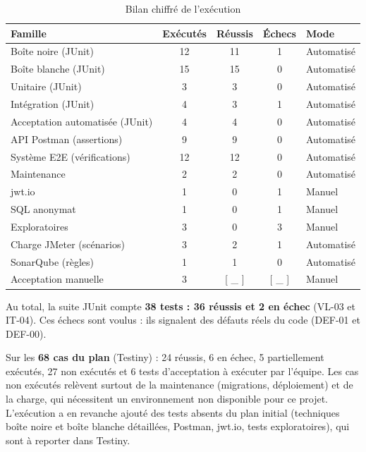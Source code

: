 \documentclass[12pt,a4paper]{report}
\begin{document}
\begin{table}[H]
\centering
\caption{Bilan chiffré de l'exécution}
\small
\begin{tabular}{@{}lcccl@{}}
\toprule
\rowcolor{evlight}\textbf{Famille} & \textbf{Exécutés} & \textbf{Réussis} & \textbf{Échecs} & \textbf{Mode}\\
\midrule
Boîte noire (JUnit) & 12 & 11 & 1 & Automatisé\\
Boîte blanche (JUnit) & 15 & 15 & 0 & Automatisé\\
Unitaire (JUnit) & 3 & 3 & 0 & Automatisé\\
Intégration (JUnit) & 4 & 3 & 1 & Automatisé\\
Acceptation automatisée (JUnit) & 4 & 4 & 0 & Automatisé\\
API Postman (assertions) & 9 & 9 & 0 & Automatisé\\
Système E2E (vérifications) & 12 & 12 & 0 & Automatisé\\
Maintenance & 2 & 2 & 0 & Automatisé\\
jwt.io & 1 & 0 & 1 & Manuel\\
SQL anonymat & 1 & 0 & 1 & Manuel\\
Exploratoires & 3 & 0 & 3 & Manuel\\
Charge JMeter (scénarios) & 3 & 2 & 1 & Automatisé\\
SonarQube (règles) & 1 & 1 & 0 & Automatisé\\
Acceptation manuelle & 3 & [ \_ ] & [ \_ ] & Manuel\\
\bottomrule
\end{tabular}
\end{table}

Au total, la suite JUnit compte \textbf{38 tests : 36 réussis et 2 en échec} (VL-03 et IT-04). Ces échecs sont voulus : ils signalent des défauts réels du code (DEF-01 et DEF-00).

Sur les \textbf{68 cas du plan} (Testiny) : 24 réussis, 6 en échec, 5 partiellement exécutés, 27 non exécutés et 6 tests d'acceptation à exécuter par l'équipe. Les cas non exécutés relèvent surtout de la maintenance (migrations, déploiement) et de la charge, qui nécessitent un environnement non disponible pour ce projet. L'exécution a en revanche ajouté des tests absents du plan initial (techniques boîte noire et boîte blanche détaillées, Postman, jwt.io, tests exploratoires), qui sont à reporter dans Testiny.
\end{document}
